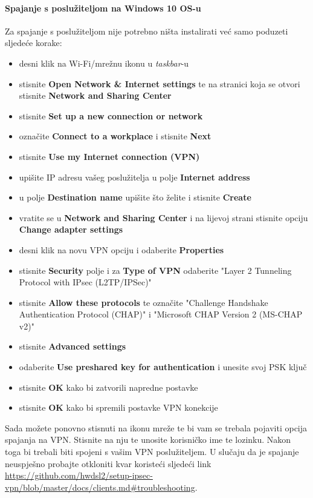 \paragraph*{Spajanje s poslužiteljom na Windows 10 OS-u}
\hfill \smallbreak
Za spajanje s poslužiteljom nije potrebno ništa instalirati već samo poduzeti sljedeće korake:
\begin{itemize}
	\item desni klik na Wi-Fi/mrežnu ikonu u \textit{taskbar}-u
	\item stisnite \textbf{Open Network \& Internet settings} te na stranici koja se otvori stisnite \textbf{Network and Sharing Center}
	\item stisnite \textbf{Set up a new connection or network}
	\item označite \textbf{Connect to a workplace} i stisnite \textbf{Next}
	\item stisnite \textbf{Use my Internet connection (VPN)}
	\item upišite IP adresu vašeg poslužitelja u polje \textbf{Internet address}
	\item u polje \textbf{Destination name} upišite što želite i stisnite \textbf{Create}
	\item vratite se u \textbf{Network and Sharing Center} i na lijevoj strani stisnite opciju \textbf{Change adapter settings}
	\item desni klik na novu VPN opciju i odaberite \textbf{Properties}
	\item stisnite \textbf{Security} polje i za \textbf{Type of VPN} odaberite "Layer 2 Tunneling Protocol with IPsec (L2TP/IPSec)"
	\item stisnite \textbf{Allow these protocols} te označite "Challenge Handshake Authentication Protocol (CHAP)" i "Microsoft CHAP Version 2 (MS-CHAP v2)"
	\item stisnite \textbf{Advanced settings}
	\item odaberite \textbf{Use preshared key for authentication} i unesite svoj PSK ključ
	\item stisnite \textbf{OK} kako bi zatvorili napredne postavke
	\item stisnite \textbf{OK} kako bi spremili postavke VPN konekcije
\end{itemize}
Sada možete ponovno stisnuti na ikonu mreže te bi vam se trebala pojaviti opcija spajanja na VPN. Stisnite na nju te unosite korisničko ime te lozinku. Nakon toga bi trebali biti spojeni s vašim VPN poslužiteljem. U slučaju da je spajanje neuspješno probajte otkloniti kvar koristeći sljedeći link \url{https://github.com/hwdsl2/setup-ipsec-vpn/blob/master/docs/clients.md#troubleshooting}.
\bigbreak
